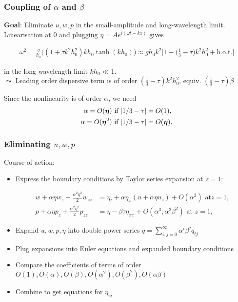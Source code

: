 \documentclass[pdftex,10pt,intlimits]{beamer}
\begin{document}
\begin{frame}
  \frametitle{Coupling of $\alpha$ and $\beta$}
  {\bf Goal}: Eliminate $u,w,p$ in the small-amplitude and long-wavelength limit.\\
 \bigskip
Linearisation at $0$ and plugging $\eta=Ae^{i(\omega t - kx)}$ gives
\begin{block}{}{\small
\begin{equation*}\begin{aligned}
\omega^2 = \frac{g}{h_0}\Big((1+\tau k^2h_0^2)kh_0\tanh(kh_0)\Big) \approx gh_0k^2\Big[1-\Big(\frac{1}{3} -
\tau\Big)k^2h_0^2 + \mbox{h.o.t.}\Big]
\end{aligned}\end{equation*}}
\end{block}
in the long wavelength limit $kh_0 \ll 1$.\\
\bigskip
$\leadsto$ Leading order dispersive term is of order $(\frac{1}{3}-\tau)k^2h_0^2$, equiv.
$(\frac{1}{3}-\tau)\beta$
\begin{block}{}
Since the nonlinearity is of order $\alpha$, we need
\begin{equation*}\begin{aligned}
  \alpha=O({\boldsymbol{\eta}}) &\mbox{ if } {\lvert{1/3-\tau}\rvert}=O(1),\\
  \alpha=O({\boldsymbol{\eta}}^2) &\mbox{ if } {\lvert{1/3-\tau}\rvert}=O({\boldsymbol{\eta}}).
\end{aligned}\end{equation*}
\end{block}
\end{frame}

\begin{frame}
  \frametitle{Eliminating $u,w,p$}
  Course of action:
  \begin{itemize}
   \item Express the boundary conditions by Taylor series expansion at $z=1$:
\begin{block}{}
\vspace{-0.35cm}
\begin{equation*}\begin{aligned}
  w + \alpha\eta w_z + \frac{\alpha^2\eta^2}{2} w_{zz}&=\eta_t+\alpha\eta_x (u + \alpha\eta u_z) + O(\alpha^3) \mbox{ at
} z=1,\\
  p + \alpha\eta p_z + \frac{\alpha^2\eta^2}{2}p_{zz}&=\eta
- \beta\tau\eta_{xx} + O(\alpha^3,\alpha^2\beta^2)\mbox{ at } z=1,
\end{aligned}\end{equation*}
\end{block}
\item Expand $u,w,p,\eta$ into double power series $q=\sum_{i,j=0}^\infty \alpha^i\beta^jq_{ij}$
\item Plug expansions into Euler equations and expanded boundary conditions
\item Compare the coefficients of terms of order $O(1),O(\alpha),O(\beta),O(\alpha^2),O(\beta^2),O(\alpha\beta)$
\item Combine to get equations for $\eta_{ij}$
 \end{itemize}
\end{frame}
\end{document}
